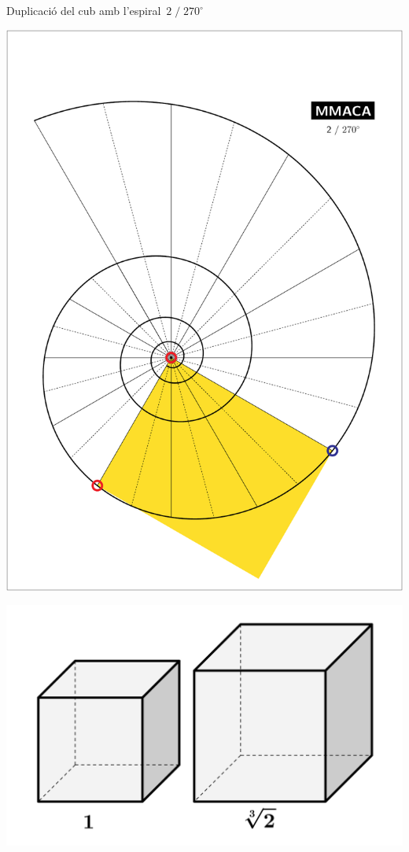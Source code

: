 \documentclass[14pt]{beamer}
\begin{document}
    \begin{frame}{Duplicació del cub amb l'espiral\, $2\;/\;270^\circ$}
        \begin{center}
            \begin{minipage}{25ex}
                \includegraphics[height=34ex]{pictures/Example_8.pdf}
            \end{minipage} \begin{minipage}{25ex}
                \includegraphics[height=15ex]{pictures/Doubling Cube.png}
            \end{minipage}
        \end{center}
    \end{frame}
    
\end{document}
